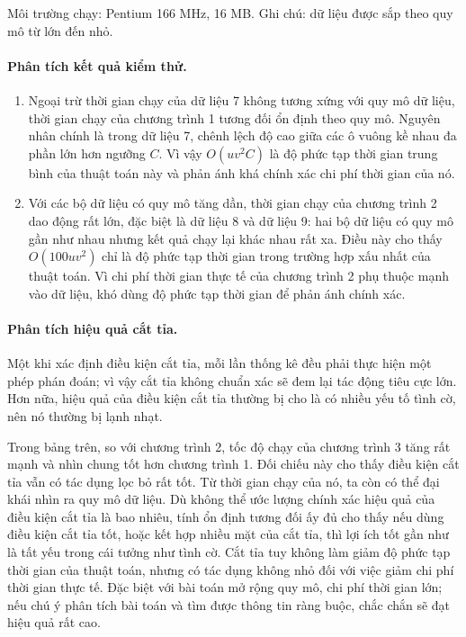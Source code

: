 \documentclass[11pt]{article}
\begin{document}
Môi trường chạy: Pentium 166 MHz, 16 MB. Ghi chú: dữ liệu được sắp theo quy
mô từ lớn đến nhỏ.

\paragraph{Phân tích kết quả kiểm thử.}
\begin{enumerate}
  \item Ngoại trừ thời gian chạy của dữ liệu 7 không tương xứng với quy mô
  dữ liệu, thời gian chạy của chương trình 1 tương đối ổn định theo quy mô.
  Nguyên nhân chính là trong dữ liệu 7, chênh lệch độ cao giữa các ô vuông
  kề nhau đa phần lớn hơn ngưỡng \(C\). Vì vậy \(O(uv^2C)\) là độ phức tạp
  thời gian trung bình của thuật toán này và phản ánh khá chính xác chi phí
  thời gian của nó.

  \item Với các bộ dữ liệu có quy mô tăng dần, thời gian chạy của chương
  trình 2 dao động rất lớn, đặc biệt là dữ liệu 8 và dữ liệu 9: hai bộ dữ
  liệu có quy mô gần như nhau nhưng kết quả chạy lại khác nhau rất xa. Điều
  này cho thấy \(O(100uv^2)\) chỉ là độ phức tạp thời gian trong trường hợp
  xấu nhất của thuật toán. Vì chi phí thời gian thực tế của chương trình 2
  phụ thuộc mạnh vào dữ liệu, khó dùng độ phức tạp thời gian để phản ánh
  chính xác.
\end{enumerate}

\paragraph{Phân tích hiệu quả cắt tỉa.}
Một khi xác định điều kiện cắt tỉa, mỗi lần thống kê đều phải thực hiện một
phép phán đoán; vì vậy cắt tỉa không chuẩn xác sẽ đem lại tác động tiêu cực
lớn. Hơn nữa, hiệu quả của điều kiện cắt tỉa thường bị cho là có nhiều yếu
tố tình cờ, nên nó thường bị lạnh nhạt.

Trong bảng trên, so với chương trình 2, tốc độ chạy của chương trình 3 tăng
rất mạnh và nhìn chung tốt hơn chương trình 1. Đối chiếu này cho thấy điều
kiện cắt tỉa vẫn có tác dụng lọc bỏ rất tốt. Từ thời gian chạy của nó, ta còn
có thể đại khái nhìn ra quy mô dữ liệu. Dù không thể ước lượng chính xác hiệu
quả của điều kiện cắt tỉa là bao nhiêu, tính ổn định tương đối ấy đủ cho
thấy nếu dùng điều kiện cắt tỉa tốt, hoặc kết hợp nhiều mặt của cắt tỉa, thì
lợi ích tốt gần như là tất yếu trong cái tưởng như tình cờ. Cắt tỉa tuy
không làm giảm độ phức tạp thời gian của thuật toán, nhưng có tác dụng không
nhỏ đối với việc giảm chi phí thời gian thực tế. Đặc biệt với bài toán mở
rộng quy mô, chi phí thời gian lớn; nếu chú ý phân tích bài toán và tìm được
thông tin ràng buộc, chắc chắn sẽ đạt hiệu quả rất cao.
\end{document}
